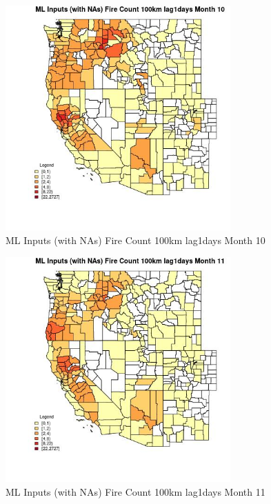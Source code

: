 \begin{figure} 
\centering  
\includegraphics[width=0.77\textwidth]{Code_Outputs/Report_ML_input_PM25_Step4_part_f_de_duplicated_aves_prioritize_24hr_obswNAs_CountyFire_Count_100km_lag1daysmedianMonth10.jpg} 
\caption{\label{fig:Report_ML_input_PM25_Step4_part_f_de_duplicated_aves_prioritize_24hr_obswNAsCountyFire_Count_100km_lag1daysmedianMonth10}ML Inputs (with NAs) Fire Count 100km lag1days Month 10} 
\end{figure} 
 

\begin{figure} 
\centering  
\includegraphics[width=0.77\textwidth]{Code_Outputs/Report_ML_input_PM25_Step4_part_f_de_duplicated_aves_prioritize_24hr_obswNAs_CountyFire_Count_100km_lag1daysmedianMonth11.jpg} 
\caption{\label{fig:Report_ML_input_PM25_Step4_part_f_de_duplicated_aves_prioritize_24hr_obswNAsCountyFire_Count_100km_lag1daysmedianMonth11}ML Inputs (with NAs) Fire Count 100km lag1days Month 11} 
\end{figure} 
 

